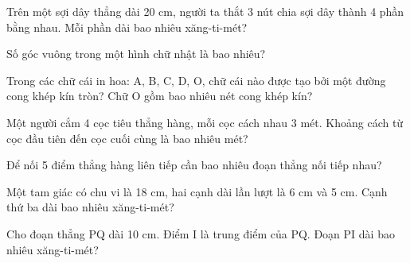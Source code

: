 \begin{ex}
Trên một sợi dây thẳng dài 20 cm, người ta thắt 3 nút chia sợi dây thành 4 phần bằng nhau. Mỗi phần dài bao nhiêu xăng-ti-mét?
\end{ex}

\begin{ex}
Số góc vuông trong một hình chữ nhật là bao nhiêu?
\end{ex}

\begin{ex}
Trong các chữ cái in hoa: A, B, C, D, O, chữ cái nào được tạo bởi một đường cong khép kín tròn? Chữ O gồm bao nhiêu nét cong khép kín?
\end{ex}

\begin{ex}
Một người cắm 4 cọc tiêu thẳng hàng, mỗi cọc cách nhau 3 mét. Khoảng cách từ cọc đầu tiên đến cọc cuối cùng là bao nhiêu mét?
\end{ex}

\begin{ex}
Để nối 5 điểm thẳng hàng liên tiếp cần bao nhiêu đoạn thẳng nối tiếp nhau?
\end{ex}

\begin{ex}
Một tam giác có chu vi là 18 cm, hai cạnh dài lần lượt là 6 cm và 5 cm. Cạnh thứ ba dài bao nhiêu xăng-ti-mét?
\end{ex}

\begin{ex}
Cho đoạn thẳng PQ dài 10 cm. Điểm I là trung điểm của PQ. Đoạn PI dài bao nhiêu xăng-ti-mét?
\end{ex}
